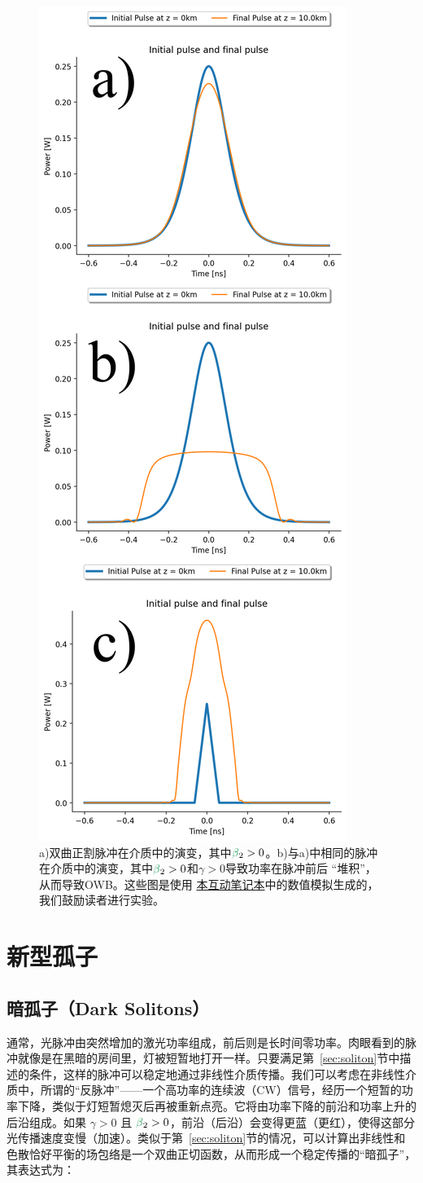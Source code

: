 \begin{figure}
    \centering
    \includegraphics[width=0.5\linewidth]{figures/OWB_and_similariton.png}
    \caption{a)双曲正割脉冲在介质中的演变，其中$\betag_2>0$。b)与a)中相同的脉冲在介质中的演变，其中$\betag_2>0$和$\gamma>0$导致功率在脉冲前后 “堆积”，从而导致OWB。这些图是使用 \href{https://colab.research.google.com/drive/1qtMcXElXn4VBntfCgXIGGkyDfiGicElx?usp=sharing}{本互动笔记本}中的数值模拟生成的，我们鼓励读者进行实验。}
    \label{fig:OWB_and_similariton}
\end{figure}

\section{新型孤子}

\subsection{暗孤子（Dark Solitons）}
通常，光脉冲由突然增加的激光功率组成，前后则是长时间零功率。肉眼看到的脉冲就像是在黑暗的房间里，灯被短暂地打开一样。只要满足第~\ref{sec:soliton}节中描述的条件，这样的脉冲可以稳定地通过非线性介质传播。我们可以考虑在非线性介质中，所谓的“反脉冲”——一个高功率的连续波（CW）信号，经历一个短暂的功率下降，类似于灯短暂熄灭后再被重新点亮。它将由功率下降的前沿和功率上升的后沿组成。如果 $\gamma>0$ 且 $\betag_2>0$，前沿（后沿）会变得更蓝（更红），使得这部分光传播速度变慢（加速）。类似于第~\ref{sec:soliton}节的情况，可以计算出非线性和色散恰好平衡的场包络是一个双曲正切函数，从而形成一个稳定传播的“暗孤子”，其表达式为：

